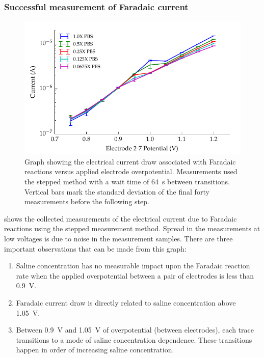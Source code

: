         \subsubsection*{Successful measurement of Faradaic current}
        \begin{figure}
          \centering
          \includegraphics{content/pt2/08-InterfaceParameters/graphics/graph_currentVoltage_logY_Thesis}
          \caption{\label{fig:graph_currentVoltage_logY_Thesis}Graph showing the electrical current draw associated with Faradaic reactions versus applied electrode overpotential. Measurements used the stepped method with a wait time of \SI{64}{\second} between transitions. Vertical bars mark the standard deviation of the final forty measurements before the following step.}
        \end{figure}
         shows the collected measurements of the electrical current due to Faradaic reactions using the stepped measurement method.
        Spread in the measurements at low voltages is due to noise in the measurement samples.
        There are three important observations that can be made from this graph:
        \begin{enumerate}
          \item Saline concentration has no measurable impact upon the Faradaic reaction rate when the applied overpotential between a pair of electrodes is less than \SI{0.9}{\volt}.
          \item Faradaic current draw is directly related to saline concentration above \SI{1.05}{\volt}.
          \item Between \SI{0.9}{\volt} and \SI{1.05}{\volt} of overpotential (between electrodes), each trace transitions to a mode of saline concentration dependence. These transitions happen in order of increasing saline concentration.
        \end{enumerate}

